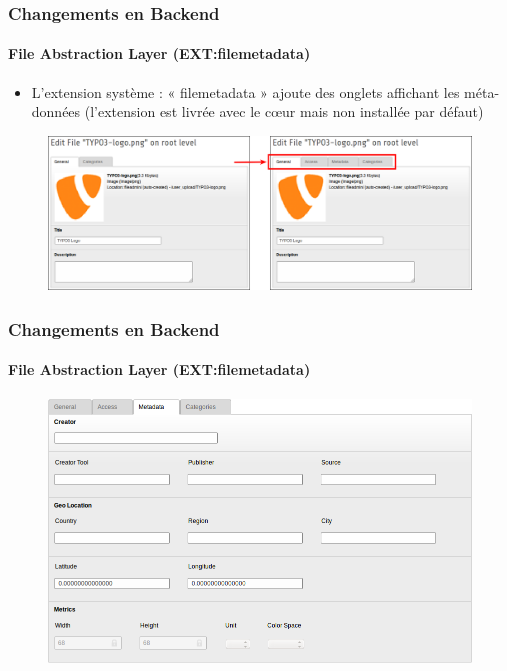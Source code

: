
\begin{frame}[fragile]
	\frametitle{Changements en Backend}
	\framesubtitle{File Abstraction Layer (EXT:filemetadata)}

	\begin{itemize}
		\item L'extension système : « filemetadata » ajoute des onglets affichant les méta-données
			(l'extension est livrée avec le cœur mais non installée par défaut)
	\end{itemize}

	\begin{figure}
		\includegraphics[width=0.95\linewidth]{Images/BackendChanges/FileMetaDataTabs.png}
	\end{figure}

\end{frame}


\begin{frame}[fragile]

	\frametitle{Changements en Backend}
	\framesubtitle{File Abstraction Layer (EXT:filemetadata)}

	\begin{figure}
		\includegraphics[width=0.8\linewidth]{Images/BackendChanges/FileMetaData.png}
	\end{figure}

\end{frame}

